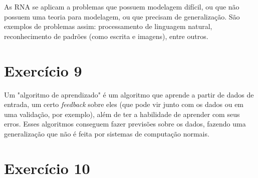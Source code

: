 \documentclass[a4]{article}
\begin{document}
As RNA se aplicam a problemas que possuem modelagem difícil, ou que não possuem uma teoria para modelagem, ou que precisam de generalização. São exemplos de problemas assim: processamento de linguagem natural, reconhecimento de padrões (como escrita e imagens), entre outros.

\section*{Exercício 9}

Um "algoritmo de aprendizado" é um algoritmo que aprende a partir de dados de entrada, um certo \textit{feedback} sobre eles (que pode vir junto com os dados ou em uma validação, por exemplo), além de ter a habilidade de aprender com seus erros. Esses algoritmos conseguem fazer previsões sobre os dados, fazendo uma generalização que não é feita por sistemas de computação normais.

\section*{Exercício 10}
\end{document}
